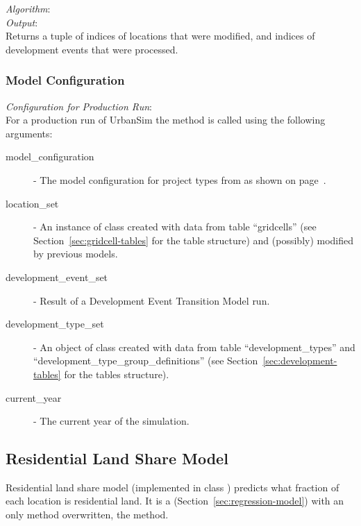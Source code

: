 {\it Algorithm}:\\[1mm]


{\it Output}:~\\[1mm]
Returns a tuple of indices of locations that were modified, and indices of
development events that were processed.

\subsubsection{Model Configuration}
\modelsindex
%
{\em Configuration for Production Run}:\\[1mm]
For a production run of UrbanSim the method  is called using the
following arguments:
\begin{description}
\item[model_configuration] \modelsindex - The model \modelsindex configuration for project types from
   as shown on page~\pageref{page:model-configuration}.
\item[location_set] - An instance of class  created with
  data from table ``gridcells'' (see Section~\ref{sec:gridcell-tables} for the
  table structure) and (possibly) modified by previous models. \modelsindex
\item[development_event_set] - Result of a Development Event Transition Model \modelsindex
  run.
\item[development_type_set] - An object of class 
  created with data from table ``development_types'' and
  ``development_type_group_definitions'' (see
  Section~\ref{sec:development-tables} for the tables structure).
\item[current_year] - The current year of the simulation.
\end{description}

%
\subsection{Residential Land Share Model}
\modelsindex
%
\label{sec:residential-land-share-model}

Residential land share model \modelsindex (implemented in class
) \modelsindex predicts what fraction of each location is
residential land. It is a  \modelsindex
(Section~\ref{sec:regression-model}) \modelsindex with an only method overwritten, the
 method.

